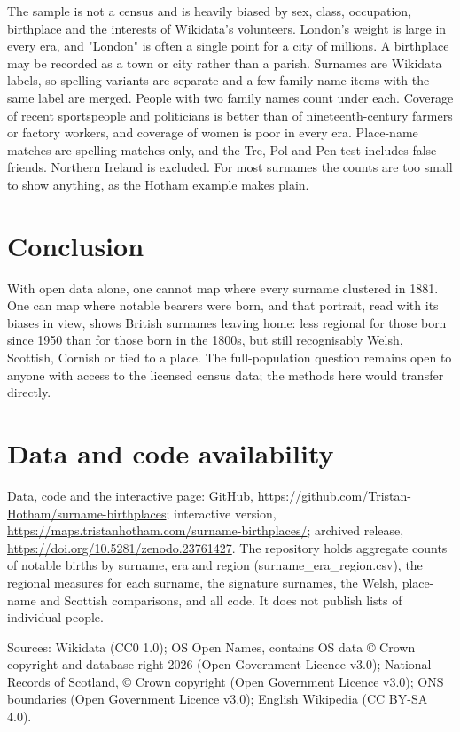 \documentclass[11pt,a4paper]{article}
\begin{document}
The sample is not a census and is heavily biased by sex, class, occupation, birthplace and the interests of Wikidata's volunteers. London's weight is large in every era, and "London" is often a single point for a city of millions. A birthplace may be recorded as a town or city rather than a parish. Surnames are Wikidata labels, so spelling variants are separate and a few family-name items with the same label are merged. People with two family names count under each. Coverage of recent sportspeople and politicians is better than of nineteenth-century farmers or factory workers, and coverage of women is poor in every era. Place-name matches are spelling matches only, and the Tre, Pol and Pen test includes false friends. Northern Ireland is excluded. For most surnames the counts are too small to show anything, as the Hotham example makes plain.

\section{Conclusion}

With open data alone, one cannot map where every surname clustered in 1881. One can map where notable bearers were born, and that portrait, read with its biases in view, shows British surnames leaving home: less regional for those born since 1950 than for those born in the 1800s, but still recognisably Welsh, Scottish, Cornish or tied to a place. The full-population question remains open to anyone with access to the licensed census data; the methods here would transfer directly.

\section*{Data and code availability}

Data, code and the interactive page: GitHub, \url{https://github.com/Tristan-Hotham/surname-birthplaces}; interactive version, \url{https://maps.tristanhotham.com/surname-birthplaces/}; archived release, \url{https://doi.org/10.5281/zenodo.23761427}. The repository holds aggregate counts of notable births by surname, era and region (surname\_era\_region.csv), the regional measures for each surname, the signature surnames, the Welsh, place-name and Scottish comparisons, and all code. It does not publish lists of individual people.

Sources: Wikidata (CC0 1.0); OS Open Names, contains OS data © Crown copyright and database right 2026 (Open Government Licence v3.0); National Records of Scotland, © Crown copyright (Open Government Licence v3.0); ONS boundaries (Open Government Licence v3.0); English Wikipedia (CC BY-SA 4.0).
\end{document}
